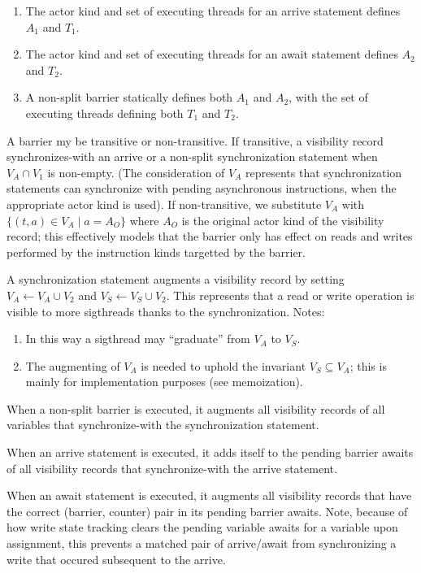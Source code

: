 \filbreak
\begin{enumerate}
  \item The actor kind and set of executing threads for an arrive statement defines $A_1$ and $T_1$.
  \item The actor kind and set of executing threads for an await statement defines $A_2$ and $T_2$.
  \item A non-split barrier statically defines both $A_1$ and $A_2$, with the set of executing threads defining both $T_1$ and $T_2$.
\end{enumerate}

\filbreak
A barrier my be transitive or non-transitive.
If transitive, a visibility record synchronizes-with an arrive or a non-split synchronization statement when ${V_A \cap V_1}$ is non-empty.
(The consideration of $V_A$ represents that synchronization statements can synchronize with pending asynchronous instructions, when the appropriate actor kind is used).
If non-transitive, we substitute $V_A$ with ${\{ (t, a) \in V_A \mid a = A_O \}}$ where $A_O$ is the original actor kind of the visibility record; this effectively models that the barrier only has effect on reads and writes performed by the instruction kinds targetted by the barrier.

\filbreak
A synchronization statement augments a visibility record by setting ${V_A \leftarrow V_A \cup V_2}$ and ${V_S \leftarrow V_S \cup V_2}$.
This represents that a read or write operation is visible to more sigthreads thanks to the synchronization.
Notes:
\begin{enumerate}
  \item In this way a sigthread may ``graduate'' from $V_A$ to $V_S$.
  \item The augmenting of $V_A$ is needed to uphold the invariant $V_S \subseteq V_A$; this is mainly for implementation purposes (see memoization).
\end{enumerate}

\filbreak
When a non-split barrier is executed, it augments all visibility records of all variables that synchronize-with the synchronization statement.

\filbreak
When an arrive statement is executed, it adds itself to the pending barrier awaits of all visibility records that synchronize-with the arrive statement.

\filbreak
When an await statement is executed, it augments all visibility records that have the correct (barrier, counter) pair in its pending barrier awaits.
Note, because of how write state tracking clears the pending variable awaits for a variable upon assignment, this prevents a matched pair of arrive/await from synchronizing a write that occured subsequent to the arrive.


